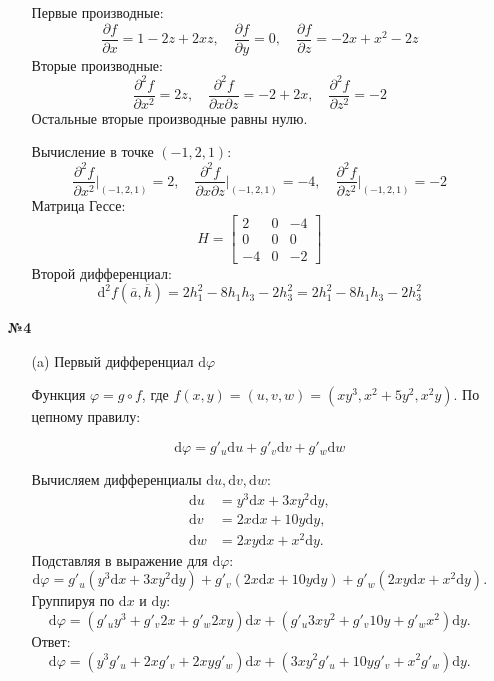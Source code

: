 \documentclass[a4paper]{article}
\begin{document}
\begin{enumerate}
\begin{enumerate}
        Первые производные:
        \[
        \frac{\partial f}{\partial x} = 1 - 2z + 2xz, \quad \frac{\partial f}{\partial y} = 0, \quad \frac{\partial f}{\partial z} = -2x + x^2 - 2z
        \]
        Вторые производные:
        \[
        \frac{\partial^2 f}{\partial x^2} = 2z, \quad \frac{\partial^2 f}{\partial x \partial z} = -2 + 2x, \quad \frac{\partial^2 f}{\partial z^2} = -2
        \]
        Остальные вторые производные равны нулю.

        Вычисление в точке \((-1, 2, 1)\):
        \[
        \frac{\partial^2 f}{\partial x^2}\bigg|_{(-1, 2, 1)} = 2, \quad \frac{\partial^2 f}{\partial x \partial z}\bigg|_{(-1, 2, 1)} = -4, \quad \frac{\partial^2 f}{\partial z^2}\bigg|_{(-1, 2, 1)} = -2
        \]
        Матрица Гессе:
        \[
        H = \begin{bmatrix}
        2 & 0 & -4 \\
        0 & 0 & 0 \\
        -4 & 0 & -2
        \end{bmatrix}
        \]
        Второй дифференциал:
        \[
        \mathrm{d}^2 f(\overline{a}, \overline{h}) = 2 h_1^2 - 8 h_1 h_3 - 2 h_3^2 =
        2 h_1^2 - 8 h_1 h_3 - 2 h_3^2
        \]
         
    \end{enumerate}
    
    \item[\textbf{№4}]
    \begin{enumerate}
        \item[(a)]
        Первый дифференциал \( \mathrm{d}\varphi \)
    
        Функция \( \varphi = g \circ f \), где \( f(x, y) = (u, v, w) = (xy^3, x^2 + 5y^2, x^2y) \). По цепному правилу:
        
        \[
        \mathrm{d}\varphi = g'_u \mathrm{d}u + g'_v \mathrm{d}v + g'_w \mathrm{d}w
        \]
        
        Вычисляем дифференциалы \( \mathrm{d}u, \mathrm{d}v, \mathrm{d}w \):
        \[
        \begin{aligned}
        \mathrm{d}u &= y^3 \mathrm{d}x + 3xy^2 \mathrm{d}y, \\
        \mathrm{d}v &= 2x \mathrm{d}x + 10y \mathrm{d}y, \\
        \mathrm{d}w &= 2xy \mathrm{d}x + x^2 \mathrm{d}y.
        \end{aligned}
        \]
        Подставляя в выражение для \( \mathrm{d}\varphi \):
        \[
        \mathrm{d}\varphi = g'_u (y^3 \mathrm{d}x + 3xy^2 \mathrm{d}y) + g'_v (2x \mathrm{d}x + 10y \mathrm{d}y) + g'_w (2xy \mathrm{d}x + x^2 \mathrm{d}y).
        \]
        Группируя по \( \mathrm{d}x \) и \( \mathrm{d}y \):
        \[
        \mathrm{d}\varphi = \left( g'_u y^3 + g'_v 2x + g'_w 2xy \right) \mathrm{d}x + \left( g'_u 3xy^2 + g'_v 10y + g'_w x^2 \right) \mathrm{d}y.
        \]
        Ответ:
        \[
        \mathrm{d}\varphi = \left( y^3 g'_u + 2x g'_v + 2xy g'_w \right) \mathrm{d}x + \left( 3xy^2 g'_u + 10y g'_v + x^2 g'_w \right) \mathrm{d}y.
        \]


\end{enumerate}
\end{enumerate}
\end{document}
